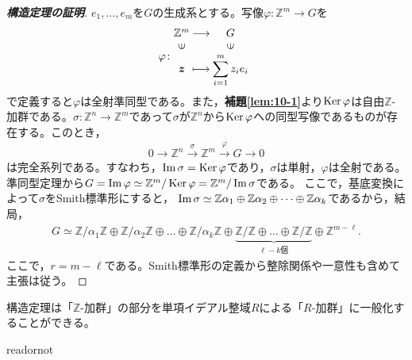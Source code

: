 \documentclass[uplatex]{jsarticle}
\begin{document}
\begin{proof}[\textbf{構造定理の証明}]
  $e_{1}, \dots, e_{m}$を$G$の生成系とする。写像$\varphi \colon \mathbb{Z}^{m} \longrightarrow G$を
  \begin{align}
    \varphi \colon \mapdef{\mathbb{Z}^{m}}{G}{\bm{z}}{\displaystyle \sum_{i=1}^{m} z_{i} e_{i}}
  \end{align}
  で定義すると$\varphi$は全射準同型である。また，\textbf{補題\ref{lem:10-1}}より$\operatorname{Ker} \varphi$は自由$\mathbb{Z}$-加群である。$\sigma \colon \mathbb{Z}^{n} \longrightarrow \mathbb{Z}^{m}$であって$\sigma$が$\mathbb{Z}^{n}$から$\operatorname{Ker} \varphi$への同型写像であるものが存在する。このとき，
  \begin{align}
    0 \longrightarrow \mathbb{Z}^{n} \stackrel{\sigma}{\longrightarrow} \mathbb{Z}^{m} \stackrel{\varphi}{\longrightarrow} G \longrightarrow 0
  \end{align}
  は完全系列である。すなわち，$\operatorname{Im} \sigma = \operatorname{Ker} \varphi$であり，$\sigma$は単射，$\varphi$は全射である。準同型定理から$G = \operatorname{Im} \varphi \simeq \mathbb{Z}^{m} / \operatorname{Ker} \varphi = \mathbb{Z}^{m} / \operatorname{Im} \sigma$である。
  ここで，基底変換によって$\sigma$をSmith標準形にすると，
  $\operatorname{Im} \sigma \simeq \mathbb{Z} \alpha_{1} \oplus \mathbb{Z} \alpha_{2} \oplus \dots \oplus \mathbb{Z} \alpha_{k}$であるから，結局，
  \begin{align}
    G \simeq \mathbb{Z}/\alpha_{1}\mathbb{Z} \oplus \mathbb{Z}/\alpha_{2}\mathbb{Z} \oplus \dots \oplus \mathbb{Z}/\alpha_{k}\mathbb{Z} \oplus \underbrace{\mathbb{Z}/\mathbb{Z} \oplus \dots \oplus \mathbb{Z}/\mathbb{Z}}_{\ell -k\text{個}} \oplus \mathbb{Z}^{m - \ell}.
  \end{align}
  ここで，$r = m -\ell$である。Smith標準形の定義から整除関係や一意性も含めて主張は従う。
\end{proof}

 構造定理は「$\mathbb{Z}$-加群」の部分を単項イデアル整域$R$による「$R$-加群」に一般化することができる。

\expandafter\ifx\csname readornot\endcsname\relax
  
\end{document}
